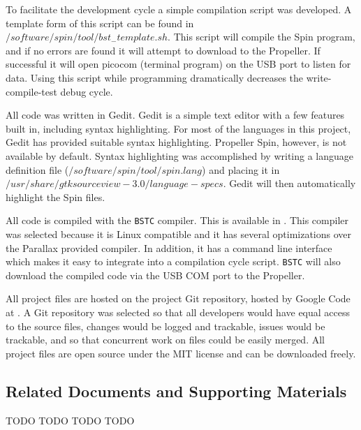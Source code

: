 \documentclass{article}
\numberwithin{equation}{section} %
\begin{document}
To facilitate the development cycle a simple compilation script was developed. A template form of this script can be found in \\ $/software/spin/tool/bst_-template.sh$. This script will compile the Spin program, and if no errors are found it will attempt to download to the Propeller. If successful it will open picocom (terminal program) on the USB port to listen for data. Using this script while programming dramatically decreases the write-compile-test debug cycle.



All code was written in Gedit. Gedit is a simple text editor with a few features built in, including syntax highlighting. For most of the languages in this project, Gedit has provided suitable syntax highlighting. Propeller Spin, however, is not available by default. Syntax highlighting was accomplished by writing a language definition file ($/software/spin/tool/spin.lang$) and placing it in $/usr/share/gtksourceview-3.0/language-specs$. Gedit will then automatically highlight the Spin files.


All code is compiled with the \texttt{BSTC} compiler. This is available in \cite{campbell09}. This compiler was selected because it is Linux compatible and it has several optimizations over the Parallax provided compiler. In addition, it has a command line interface which makes it easy to integrate into a compilation cycle script. \texttt{BSTC} will also download the compiled code via the USB COM port to the Propeller.

All project files are hosted on the project Git repository, hosted by Google Code at \cite{anzhelka_code}. A Git repository was selected so that all developers would have equal access to the source files, changes would be logged and trackable, issues would be trackable, and so that concurrent work on files  could be easily merged. All project files are open source under the MIT license and can be downloaded freely.

\subsection{Related Documents and Supporting Materials}
TODO
TODO
TODO
TODO

\end{document}
